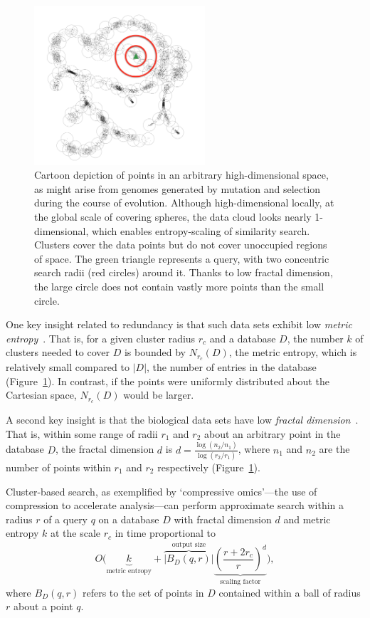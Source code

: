 \documentclass{acm_proc_article-sp}
\begin{document}
\begin{figure}[htb!]
\centering
\includegraphics[width=2.5in]{assets/treepoints-fractal.png}
\caption{Cartoon depiction of points in an arbitrary high-dimensional space, 
as might arise from genomes generated by mutation and selection during the 
course of evolution. 
Although high-dimensional locally, at the global scale of covering spheres, the 
data cloud looks nearly 1-dimensional, which enables entropy-scaling of 
similarity search. Clusters cover the data points but do not cover unoccupied 
regions of space.
The green triangle represents a query, with two concentric search radii (red 
circles) around it. Thanks to low fractal dimension, the large circle does
not contain vastly more points than the small circle.}
\label{fig:dataspace}
\end{figure}

One key insight related to redundancy
is that such data sets exhibit
low \emph{metric entropy}~\cite{yu2015entropy}.
That is, for a given cluster radius $r_c$ and a database $D$, the number $k$ 
of clusters needed to cover $D$ is bounded by $N_{r_c} (D)$, the metric 
entropy, which is relatively small compared to
$|D|$, the number of entries in the database (Figure~\ref{fig:dataspace}).
In contrast, if the points were uniformly distributed about the Cartesian space,
$N_{r_c} (D)$ would be larger.

A second key insight is that the biological data sets have low \emph{fractal dimension}~\cite{yu2015entropy}.
That is, within some range of radii $r_1$ and $r_2$ about an arbitrary point
in the database $D$, the fractal dimension $d$ is
$d=\frac{\log (n_2 / n_1)}{ \log (r_2 / r_1)}$, where $n_1$ and $n_2$ are the
number of points within $r_1$ and $r_2$ respectively (Figure~\ref{fig:dataspace}).

Cluster-based search, as exemplified by `compressive omics'---the use of compression to accelerate analysis---can perform
approximate search within a radius $r$ of a query $q$ on a database $D$ with 
fractal dimension $d$ and metric entropy $k$ at the scale $r_c$ in time
proportional to
\begin{displaymath}
    O\Bigg(
    \underbrace{k}_{\textrm{metric entropy}} +
    \overbrace{\left|B_D(q,r)\right|}^{\textrm{output size}}
    \underbrace{\left(\frac{r+2r_c}{r}\right)^d}_{\textrm{scaling factor}}
     \Bigg) ,
\end{displaymath}
where $B_D(q,r)$ refers to the set of points in $D$ contained within a ball of
radius $r$ about a point $q$.
\end{document}
